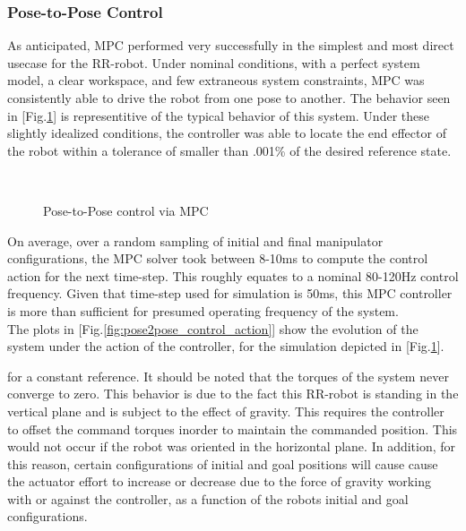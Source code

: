 \documentclass[journal]{IEEEtran}
\begin{document}
\subsubsection{Pose-to-Pose Control}

As anticipated, MPC performed very successfully in the simplest and most direct usecase for the RR-robot. Under nominal conditions, with a perfect system model, a clear workspace, and few extraneous system constraints, MPC was consistently able to drive the robot from one pose to another. The behavior seen in [Fig.\ref{fig:pose2pose}] is representitive of the typical behavior of this system. Under these slightly idealized conditions, the controller was able to locate the end effector of the robot within a tolerance of smaller than .001\% of the desired reference state.

\begin{figure}[hb]%
    \centering
    \qquad
    \\
    \qquad
    \caption{Pose-to-Pose control via MPC}%
    \label{fig:pose2pose}%
\end{figure}

On average, over a random sampling of initial and final manipulator configurations, the MPC solver took between 8-10ms to compute the control action for the next time-step. This roughly equates to a nominal 80-120Hz control frequency. Given that time-step used for simulation is 50ms, this MPC controller is more than sufficient for presumed operating frequency of the system. \\

The plots in [Fig.\ref{fig:pose2pose_control_action}] show the evolution of the system under the action of the controller, for the simulation depicted in [Fig.\ref{fig:pose2pose}].


for a constant reference. It should be noted that the torques of the system never converge to zero. This behavior is due to the fact this RR-robot is standing in the vertical plane and is subject to the effect of gravity. This requires the controller to offset the command torques inorder to maintain the commanded position. This would not occur if the robot was oriented in the horizontal plane. In addition, for this reason, certain configurations of initial and goal positions will cause cause the actuator effort to increase or decrease due to the force of gravity working with or against the controller, as a function of the robots initial and goal configurations. \\
\end{document}
